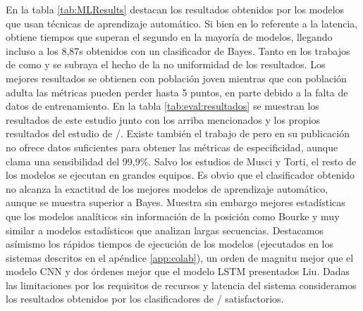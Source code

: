 En la tabla \ref{tab:MLResults} destacan los resultados obtenidos por los modelos que usan técnicas de aprendizaje automático. Si bien en lo referente a la latencia, \cite{Liu2020} obtiene tiempos que superan el segundo en la mayoría de modelos, llegando incluso a los 8,87s obtenidos con un clasificador de Bayes. Tanto en los trabajos de \cite{Liu2018, Liu2020} como \cite{Musci2020} y \cite{Torti2018} se subraya el hecho de la no uniformidad de los resultados. Los mejores resultados se obtienen con población joven mientras que con población adulta las métricas pueden perder hasta 5 puntos, en parte debido a la falta de datos de entrenamiento. En la tabla \ref{tab:eval:resultados} se muestran los resultados de este estudio junto con los arriba mencionados y los propios resultados del estudio de \sisfall/\cite{Sucerquia2017}. Existe también el trabajo de  pero en su publicación no ofrece datos suficientes para obtener las métricas de especificidad, aunque clama una sensibilidad del 99,9\%. Salvo los estudios de Musci y Torti, el resto de los modelos se ejecutan en grandes equipos. Es obvio que el clasificador obtenido no alcanza la exactitud de los mejores modelos de aprendizaje automático, aunque se muestra superior a Bayes. Muestra sin embargo mejores estadísticas que los modelos analíticos sin información de la posición como Bourke y muy similar a modelos estadísticos que analizan largas secuencias. Destacamos asímismo los rápidos tiempos de ejecución de los modelos (ejecutados en los sistemas descritos en el apéndice \ref{app:colab}), un orden de magnitu mejor que el modelo CNN y dos órdenes mejor que el modelo LSTM presentados Liu. Dadas las limitaciones por los requisitos de recursos y latencia del sistema consideramos los resultados obtenidos por los clasificadores de \ifell/ satisfactorios.


